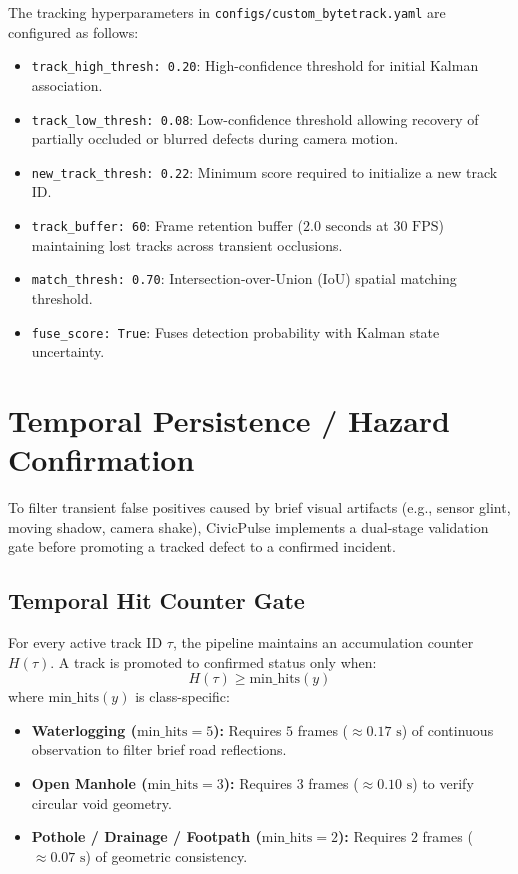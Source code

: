 \documentclass[11pt,a4paper]{article}
\begin{document}
The tracking hyperparameters in \texttt{configs/custom\_bytetrack.yaml} are configured as follows:
\begin{itemize}[leftmargin=*]
    \item \texttt{track\_high\_thresh: 0.20}: High-confidence threshold for initial Kalman association.
    \item \texttt{track\_low\_thresh: 0.08}: Low-confidence threshold allowing recovery of partially occluded or blurred defects during camera motion.
    \item \texttt{new\_track\_thresh: 0.22}: Minimum score required to initialize a new track ID.
    \item \texttt{track\_buffer: 60}: Frame retention buffer ($2.0\text{ seconds}$ at $30\text{ FPS}$) maintaining lost tracks across transient occlusions.
    \item \texttt{match\_thresh: 0.70}: Intersection-over-Union (IoU) spatial matching threshold.
    \item \texttt{fuse\_score: True}: Fuses detection probability with Kalman state uncertainty.
\end{itemize}

\section{Temporal Persistence / Hazard Confirmation}
To filter transient false positives caused by brief visual artifacts (e.g., sensor glint, moving shadow, camera shake), CivicPulse implements a dual-stage validation gate before promoting a tracked defect to a confirmed incident.

\subsection{Temporal Hit Counter Gate}
For every active track ID $\tau$, the pipeline maintains an accumulation counter $H(\tau)$. A track is promoted to confirmed status only when:
\begin{equation}
H(\tau) \ge \text{min\_hits}(y)
\end{equation}
where $\text{min\_hits}(y)$ is class-specific:
\begin{itemize}[leftmargin=*]
    \item \textbf{Waterlogging ($\text{min\_hits} = 5$):} Requires $5$ frames ($\approx 0.17\text{ s}$) of continuous observation to filter brief road reflections.
    \item \textbf{Open Manhole ($\text{min\_hits} = 3$):} Requires $3$ frames ($\approx 0.10\text{ s}$) to verify circular void geometry.
    \item \textbf{Pothole / Drainage / Footpath ($\text{min\_hits} = 2$):} Requires $2$ frames ($\approx 0.07\text{ s}$) of geometric consistency.
\end{itemize}
\end{document}
